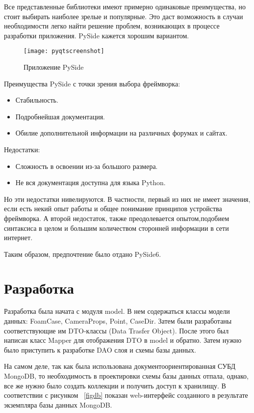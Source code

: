 \documentclass[14pt]{extreport}
\begin{document}
Все представленные библиотеки имеют примерно одинаковые преимущества, но стоит выбирать наиболее зрелые и популярные. Это даст возможность в случаи необходимости легко найти решение проблем, возникающих в процессе разработки приложения. PySide кажется хорошим вариантом.

\begin{figure}[H]
	\centerline{\texttt{[image: pyqtscreenshot]}}
	\caption{Приложение PySide}
	\label{fig14}
\end{figure}

Преимущества PySide с точки зрения выбора фреймворка:
\begin{itemize}
	\item Стабильность.
	\item Подробнейшая документация.
	\item Обилие дополнительной информации на различных форумах и сайтах.
\end{itemize}

Недостатки:
\begin{itemize}
	\item Сложность в освоении из-за большого размера.
	\item Не вся документация доступна для языка Python.
\end{itemize}

Но эти недостатки нивелируются. В частности, первый из них не имеет значения, если есть некий опыт работы и общее понимание принципов устройства фреймворка. А второй недостаток, также преодолевается опытом,подобием синтаксиса в целом и большим количеством сторонней информации в сети интернет.

Таким образом, предпочтение было отдано PySide6. 

\chapter{Разработка}
Разработка была начата с модуля model. В нем содержаться классы модели данных: FoamCase, CameraProps, Point, CaseDir. Затем были разработаны соответствующие им DTO-классы (Data Trasfer Object). После этого был написан класс Mapper для отображения DTO в model и обратно. Затем нужно было приступить к разработке DAO слоя и схемы базы данных. 

На самом деле, так как была использована документоориентированная СУБД MongoDB, то необходимость в проектировки схемы базы данных отпала, однако, все же нужно было создать коллекции и получить доступ к хранилищу. В соответствии с рисунком ~\ref{figdb} показан web-интерфейс созданного в результате экземпляра базы данных MongoDB. 
\end{document}
